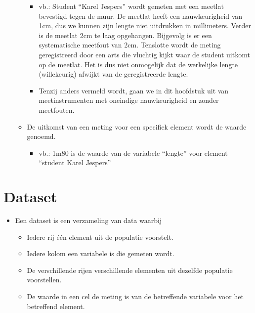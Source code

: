 \documentclass[]{memoir}
\providecommand{\tightlist}{%
  \setlength{\itemsep}{0pt}\setlength{\parskip}{0pt}}
\begin{document}
\begin{itemize}
\begin{itemize}
    \begin{itemize}
    \tightlist
    \item
      vb.: Student ``Karel Jespers'' wordt gemeten met een meetlat
      bevestigd tegen de muur. De meetlat heeft een nauwkeurigheid van
      1cm, dus we kunnen zijn lengte niet uitdrukken in millimeters.
      Verder is de meetlat 2cm te laag opgehangen. Bijgevolg is er een
      systematische meetfout van 2cm. Tenslotte wordt de meting
      geregistreerd door een arts die vluchtig kijkt waar de student
      uitkomt op de meetlat. Het is dus niet onmogelijk dat de
      werkelijke lengte (willekeurig) afwijkt van de geregistreerde
      lengte.
    \item
      Tenzij anders vermeld wordt, gaan we in dit hoofdstuk uit van
      meetinstrumenten met oneindige nauwkeurigheid en zonder
      meetfouten.
    \end{itemize}
  \item
    De uitkomst van een meting voor een specifiek element wordt de
    waarde genoemd.

    \begin{itemize}
    \tightlist
    \item
      vb.: 1m80 is de waarde van de variabele ``lengte'' voor element
      ``student Karel Jespers''
    \end{itemize}
  \end{itemize}
\end{itemize}

\section{Dataset}\label{dataset}

\begin{itemize}
\tightlist
\item
  Een dataset is een verzameling van data waarbij

  \begin{itemize}
  \tightlist
  \item
    Iedere rij één element uit de populatie voorstelt.
  \item
    Iedere kolom een variabele is die gemeten wordt.
  \item
    De verschillende rijen verschillende elementen uit dezelfde
    populatie voorstellen.
  \item
    De waarde in een cel de meting is van de betreffende variabele voor
    het betreffend element.
  \end{itemize}
\end{itemize}
\end{document}
